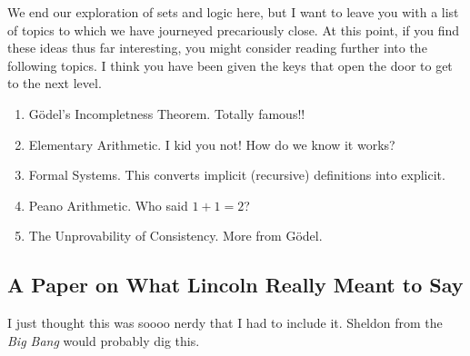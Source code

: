 We end our exploration of sets and logic here, but I want to leave you with a list of topics to which we have journeyed precariously close.  At this point, if you find these ideas thus far interesting, you might consider reading further into the following topics. I think you have been given the keys that open the door to get to the next level.
\begin{enumerate}
\item G\"odel's Incompletness Theorem.  \hfill Totally famous!!
\item Elementary Arithmetic.   \hfill I kid you not! How do we know it works?
\item Formal Systems.  \hfill This converts implicit (recursive) definitions into explicit.
\item Peano Arithmetic. \hfill Who said $1+1=2$?
\item The Unprovability of Consistency.  \hfill  More from G\"odel.
\end{enumerate}

\newpage
\subsection{A Paper on What Lincoln Really Meant to Say}
I just thought this was soooo nerdy that I had to include it.  Sheldon from the \emph{Big Bang} would probably dig this.
\fancyfoot[CE CO]{}
\fancyfoot[RE,RO]{}
\fancyfoot[LE,LO]{}
\begin{center}
\end{center}


